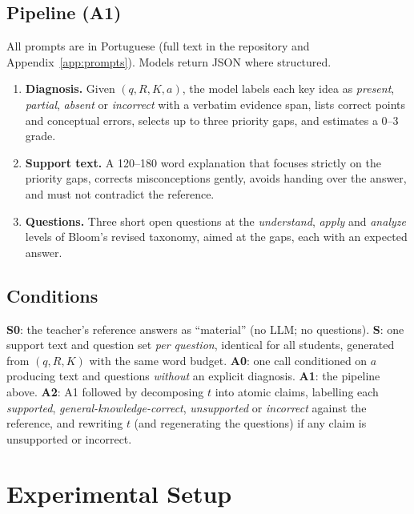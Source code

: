 \documentclass[11pt]{article}
\begin{document}
\subsection{Pipeline (A1)}
All prompts are in Portuguese (full text in the repository and Appendix~\ref{app:prompts}). Models return JSON where structured.
\begin{enumerate}\itemsep0pt
  \item \textbf{Diagnosis.} Given $(q,R,K,a)$, the model labels each key idea as \textit{present}, \textit{partial}, \textit{absent} or \textit{incorrect} with a verbatim evidence span, lists correct points and conceptual errors, selects up to three priority gaps, and estimates a 0--3 grade.
  \item \textbf{Support text.} A 120--180 word explanation that focuses strictly on the priority gaps, corrects misconceptions gently, avoids handing over the answer, and must not contradict the reference.
  \item \textbf{Questions.} Three short open questions at the \textit{understand}, \textit{apply} and \textit{analyze} levels of Bloom's revised taxonomy, aimed at the gaps, each with an expected answer.
\end{enumerate}

\subsection{Conditions}
\textbf{S0}: the teacher's reference answers as ``material'' (no LLM; no questions). \textbf{S}: one support text and question set \emph{per question}, identical for all students, generated from $(q,R,K)$ with the same word budget. \textbf{A0}: one call conditioned on $a$ producing text and questions \emph{without} an explicit diagnosis. \textbf{A1}: the pipeline above. \textbf{A2}: A1 followed by decomposing $t$ into atomic claims, labelling each \textit{supported}, \textit{general-knowledge-correct}, \textit{unsupported} or \textit{incorrect} against the reference, and rewriting $t$ (and regenerating the questions) if any claim is unsupported or incorrect.

\section{Experimental Setup}
\label{sec:setup}
\end{document}
